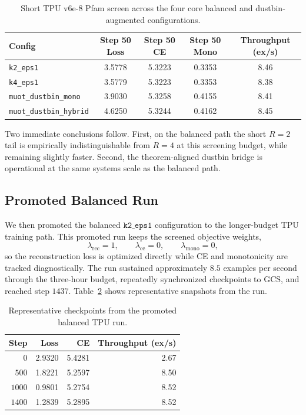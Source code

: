 \documentclass{article}
\begin{document}
\begin{table}[h]
    \centering
    \begin{tabular}{@{}lcccc@{}}
        \toprule
        Config & Step 50 Loss & Step 50 CE & Step 50 Mono & Throughput (ex/s) \\
        \midrule
        \texttt{k2\_eps1} & 3.5778 & 5.3223 & 0.3353 & 8.46 \\
        \texttt{k4\_eps1} & 3.5779 & 5.3223 & 0.3353 & 8.38 \\
        \texttt{muot\_dustbin\_mono} & 3.9030 & 5.3258 & 0.4155 & 8.41 \\
        \texttt{muot\_dustbin\_hybrid} & 4.6250 & 5.3244 & 0.4162 & 8.45 \\
        \bottomrule
    \end{tabular}
    \caption{Short TPU v6e-8 Pfam screen across the four core balanced and dustbin-augmented configurations.}
    \label{tab:screen_unified}
\end{table}

Two immediate conclusions follow. First, on the balanced path the short $R=2$ tail is empirically indistinguishable from $R=4$ at this screening budget, while remaining slightly faster. Second, the theorem-aligned dustbin bridge is operational at the same systems scale as the balanced path.

\subsection{Promoted Balanced Run}

We then promoted the balanced $\texttt{k2\_eps1}$ configuration to the longer-budget TPU training path. This promoted run keeps the screened objective weights,
\[
\lambda_{\mathrm{rec}}=1,\qquad \lambda_{\mathrm{ce}}=0,\qquad \lambda_{\mathrm{mono}}=0,
\]
so the reconstruction loss is optimized directly while CE and monotonicity are tracked diagnostically. The run sustained approximately $8.5$ examples per second through the three-hour budget, repeatedly synchronized checkpoints to GCS, and reached step $1437$. Table~\ref{tab:promoted_unified} shows representative snapshots from the run.

\begin{table}[h]
    \centering
    \begin{tabular}{@{}rrrr@{}}
        \toprule
        Step & Loss & CE & Throughput (ex/s) \\
        \midrule
        $0$ & 2.9320 & 5.4281 & 2.67 \\
        $500$ & 1.8221 & 5.2597 & 8.50 \\
        $1000$ & 0.9801 & 5.2754 & 8.52 \\
        $1400$ & 1.2839 & 5.2895 & 8.52 \\
        \bottomrule
    \end{tabular}
    \caption{Representative checkpoints from the promoted balanced TPU run.}
    \label{tab:promoted_unified}
\end{table}
\end{document}

